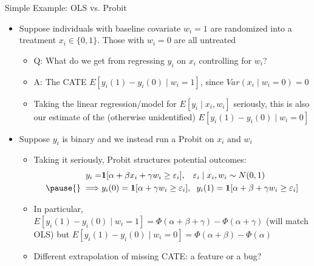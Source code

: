 \documentclass[11pt,english]{beamer}
\begin{document}
\begin{frame}{Simple Example: OLS vs. Probit}
\begin{itemize}
\item Suppose individuals with baseline covariate $w_i=1$ are randomized into a treatment $x_i\in\{0,1\}$. Those with $w_i=0$ are all untreated\smallskip\pause{}
\begin{itemize}
\item Q: What do we get from regressing $y_i$ on $x_i$ controlling for $w_i$?\smallskip\pause{}
\item A: The CATE $E[y_i(1)-y_i(0)\mid w_i=1]$, since $Var(x_i\mid w_i=0)=0$\smallskip\pause{}
\item Taking the linear regression/model for $E[y_i\mid x_i,w_i]$ seriously, this is also our estimate of the (otherwise unidentified) $E[y_i(1)-y_i(0)\mid w_i=0]$
\end{itemize}\bigskip\pause{}
\item Suppose $y_i$ is binary and we instead run a Probit on $x_i$ and $w_i$\smallskip
\begin{itemize}
\item Taking it seriously, Probit structures potential outcomes:
\begin{align*}
 y_i=& \mathbf{1}[\alpha+\beta x_i+\gamma w_i\ge\varepsilon_i],\hspace{0.3cm} \varepsilon_i\mid x_i,w_i\sim N(0,1) \\
\pause{} \implies &  y_i(0)=\mathbf{1}[\alpha+\gamma w_i\ge \varepsilon_i],\hspace{0.2cm}y_i(1)=\mathbf{1}[\alpha+\beta + \gamma w_i\ge \varepsilon_i]
\end{align*}\pause{}\vspace{-0.2cm}
\item In particular, $E[y_i(1)-y_i(0)\mid w_i=1]=\Phi(\alpha+\beta+\gamma)-\Phi(\alpha+\gamma)$ (will match OLS) but $E[y_i(1)-y_i(0)\mid w_i=0]=\Phi(\alpha+\beta)-\Phi(\alpha)$\smallskip\pause{}
\item Different extrapolation of missing CATE: a feature or a bug?
\end{itemize}
\end{itemize}
\end{frame}
\end{document}
